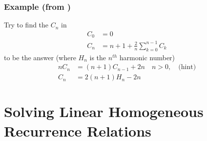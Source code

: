 \subsubsection{Example (from \cite{concrete-maths})}
Try to find the $C_n$ in 
\begin{align*}
    C_0 &= 0 \\
    C_n &= n+1 + \frac{2}{n} \sum_{k=0}^{n-1} C_k
\end{align*}
to be the answer (where $H_n$ is the $n^{th}$ harmonic number)
\begin{align*}
    nC_n &= (n+1)C_{n-1}+2n \quad n>0, \quad \text{(hint)} \\
    C_n &= 2(n+1)H_n - 2n
\end{align*}
\section{Solving Linear Homogeneous Recurrence Relations}